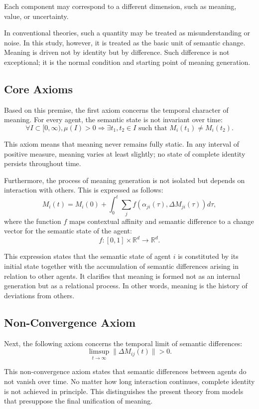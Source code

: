 \documentclass[11pt,a4paper]{article}
\theoremstyle{definition}
\begin{document}
Each component may correspond to a different dimension, such as meaning, value, or uncertainty.

In conventional theories, such a quantity may be treated as misunderstanding or noise. In this study, however, it is treated as the basic unit of semantic change. Meaning is driven not by identity but by difference. Such difference is not exceptional; it is the normal condition and starting point of meaning generation.

\subsection{Core Axioms}

Based on this premise, the first axiom concerns the temporal character of meaning. For every agent, the semantic state is not invariant over time:
\[
\forall I \subset [0,\infty), \mu(I) > 0 \Rightarrow \exists t_1, t_2 \in I \text{ such that } M_i(t_1) \neq M_i(t_2).
\]

This axiom means that meaning never remains fully static. In any interval of positive measure, meaning varies at least slightly; no state of complete identity persists throughout time.

Furthermore, the process of meaning generation is not isolated but depends on interaction with others. This is expressed as follows:
\[
M_i(t) = M_i(0) + \int_0^t \sum_j f(\alpha_{ji}(\tau), \Delta M_{ji}(\tau)) d\tau,
\]
where the function $f$ maps contextual affinity and semantic difference to a change vector for the semantic state of the agent:
\[
f : [0, 1] \times \mathbb{R}^d \to \mathbb{R}^d.
\]

This expression states that the semantic state of agent $i$ is constituted by its initial state together with the accumulation of semantic differences arising in relation to other agents. It clarifies that meaning is formed not as an internal generation but as a relational process. In other words, meaning is the history of deviations from others.

\subsection{Non-Convergence Axiom}

Next, the following axiom concerns the temporal limit of semantic differences:
\[
\limsup_{t \to \infty} \|\Delta M_{ij}(t)\| > 0.
\]

This non-convergence axiom states that semantic differences between agents do not vanish over time. No matter how long interaction continues, complete identity is not achieved in principle. This distinguishes the present theory from models that presuppose the final unification of meaning.
\end{document}
